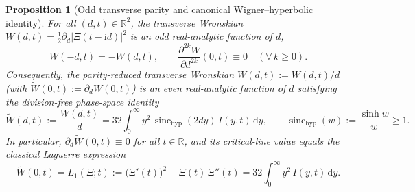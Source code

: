 \documentclass[11pt,a4paper,reqno]{amsart}
\newtheorem{proposition}[theorem]{Proposition}
\theoremstyle{definition}
\theoremstyle{remark}
\numberwithin{equation}{section}
\newcommand{\dd}{\mathrm{d}}
\newcommand{\ii}{\mathrm{i}}
\newcommand{\Wtil}{\widetilde{W}}
\newcommand{\sinch}{\operatorname{sinc}_{\mathrm{hyp}}}
\begin{document}
\begin{proposition}[Odd transverse parity and canonical Wigner--hyperbolic identity]\label{prop:parity_wigner}
For all $(d,t) \in \mathbb{R}^2$, the transverse Wronskian $W(d,t) = \frac{1}{2}\partial_d|\Xi(t-\ii d)|^2$ is an odd real-analytic function of $d$,
\begin{equation}\label{eq:odd_parity}
W(-d,t) = -W(d,t), \qquad \frac{\partial^{2k} W}{\partial d^{2k}}(0,t) \equiv 0 \quad (\forall\, k \ge 0).
\end{equation}
Consequently, the parity-reduced transverse Wronskian $\Wtil(d,t) := W(d,t)/d$ (with $\Wtil(0,t) := \partial_d W(0,t)$) is an even real-analytic function of $d$ satisfying the division-free phase-space identity
\begin{equation}\label{eq:boxed_wtilde}
\boxed{\Wtil(d,t) := \frac{W(d,t)}{d} = 32\int_0^\infty y^2\,\sinch(2d y)\,I(y,t)\,\dd y, \qquad \sinch(w) := \frac{\sinh w}{w} \ge 1.}
\end{equation}
In particular, $\partial_d\Wtil(0,t) \equiv 0$ for all $t \in \mathbb{R}$, and its critical-line value equals the classical Laguerre expression
\begin{equation}\label{eq:Wtil_d0}
\Wtil(0,t) = L_1(\Xi;t) := \big(\Xi'(t)\big)^2 - \Xi(t)\,\Xi''(t) = 32\int_0^\infty y^2\,I(y,t)\,\dd y.
\end{equation}
\end{proposition}
\end{document}
